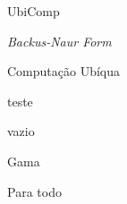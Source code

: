 \documentclass[tg]{mdtufsm}
\begin{document}


\listoftables

\listofappendix

\listofannex

\begin{listofabbrv}{UbiComp}
   \item [BNF] \textit{Backus-Naur Form}
   \item [UbiComp] Computação Ubíqua
\end{listofabbrv}


\begin{listofsymbols}{teste}
  \item [$\varnothing$] vazio
  \item [$\Gamma$]  Gama
  \item [$\forall$] Para todo
\end{listofsymbols}

\tableofcontents
\end{document}
